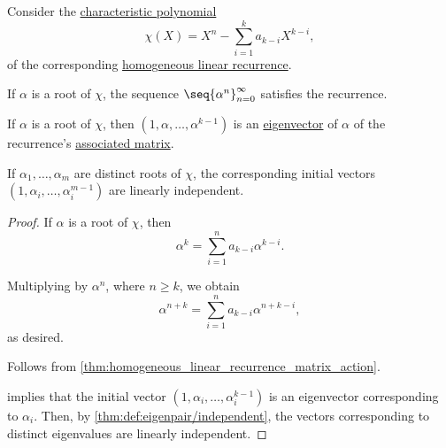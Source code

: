 \begin{proposition}\label{thm:linear_recurrence_characteristic_roots}
  Consider the \hyperref[def:linear_recurrence_characteristic_polynomial]{characteristic polynomial}
  \begin{equation*}
    \chi(X) = X^n - \sum_{i=1}^k a_{k-i} X^{k-i},
  \end{equation*}
  of the corresponding \hyperref[def:homogeneous_linear_recurrence]{homogeneous linear recurrence}.

  \begin{thmenum}
     If \( \alpha \) is a root of \( \chi \), the sequence \( \seq{ \alpha^n }_{n=0}^\infty \) satisfies the recurrence.

     If \( \alpha \) is a root of \( \chi \), then \( (1, \alpha, \ldots, \alpha^{k-1}) \) is an \hyperref[def:eigenpair]{eigenvector} of \( \alpha \) of the recurrence's \hyperref[def:homogeneous_linear_recurrence_matrix]{associated matrix}.

     If \( \alpha_1, \ldots, \alpha_m \) are distinct roots of \( \chi \), the corresponding initial vectors \( (1, \alpha_i, \ldots, \alpha_i^{m-1}) \) are linearly independent.
  \end{thmenum}
\end{proposition}
\begin{proof}
   If \( \alpha \) is a root of \( \chi \), then
  \begin{equation*}
    \alpha^k = \sum_{i=1}^n a_{k-i} \alpha^{k-i}.
  \end{equation*}

  Multiplying by \( \alpha^n \), where \( n \geq k \), we obtain
  \begin{equation*}
    \alpha^{n+k}
    =
    \sum_{i=1}^n a_{k-i} \alpha^{n+k-i},
  \end{equation*}
  as desired.

   Follows from \cref{thm:homogeneous_linear_recurrence_matrix_action}.

    implies that the initial vector \( (1, \alpha_i, \ldots, \alpha_i^{k-1}) \) is an eigenvector corresponding to \( \alpha_i \). Then, by \cref{thm:def:eigenpair/independent}, the vectors corresponding to distinct eigenvalues are linearly independent.
\end{proof}

